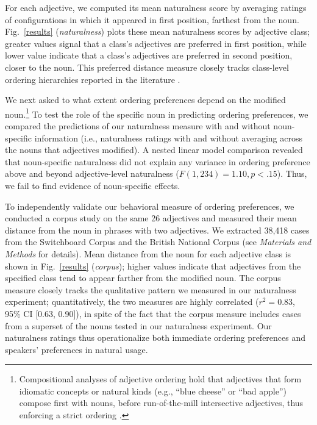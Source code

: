 \documentclass{pnastwo}
\begin{document}
\begin{article}
For each adjective, we computed its mean naturalness score by averaging ratings of configurations in which it appeared in first position, farthest from the noun. Fig.\ \ref{results} (\emph{naturalness}) plots these mean naturalness scores by adjective class; greater values signal that a class's adjectives are preferred in first position, while lower value indicate that a class's adjectives are preferred in second position, closer to the noun. This preferred distance measure closely tracks class-level ordering hierarchies reported in the literature \cite{dixon1982,sproatshih1991}.

We next asked to what extent ordering preferences depend on the modified noun.\footnote{Compositional analyses of adjective ordering hold that adjectives that form idiomatic concepts or natural kinds (e.g., ``blue cheese'' or ``bad apple'') compose first with nouns, before run-of-the-mill intersective adjectives, thus enforcing a strict ordering \cite{mcnallyboleda2004,svenonius2008}.} To test the role of the specific noun in predicting ordering preferences, we compared the predictions of our naturalness measure with and without noun-specific information (i.e., naturalness ratings with and without averaging across the nouns that adjectives modified). A nested linear model comparison revealed that noun-specific naturalness did not explain any variance in ordering preference above and beyond adjective-level naturalness ($F(1,234) = 1.10, p < .15$).  Thus, we fail to find evidence of noun-specific effects.

To independently validate our behavioral measure of ordering preferences, we conducted a corpus study on the same 26 adjectives and measured their mean distance from the noun in phrases with two adjectives. We extracted 38,418 cases from the Switchboard Corpus and the British National Corpus (see \emph{Materials and Methods} for details). Mean distance from the noun for each adjective class is shown in Fig.~\ref{results} (\emph{corpus}); higher values indicate that adjectives from the specified class tend to appear farther from the modified noun. The corpus measure closely tracks the qualitative pattern we measured in our naturalness experiment; quantitatively, the two measures are highly correlated ($r^{2}=0.83$, 95\% CI [0.63, 0.90]), in spite of the fact that the corpus measure includes cases from a superset of the nouns tested in our naturalness experiment. Our naturalness ratings thus operationalize both immediate ordering preferences and speakers' preferences in natural usage.



\end{article}
\end{document}
